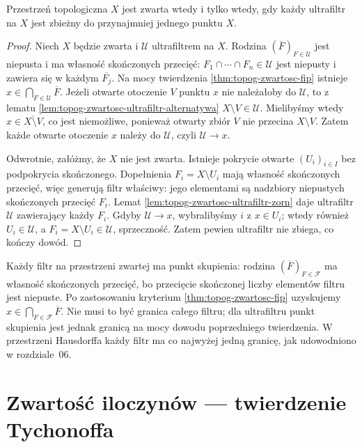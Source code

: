 \begin{twierdzenie}
\label{thm:topog-zwartosc-ultrafiltry}
Przestrzeń topologiczna $X$ jest zwarta wtedy i tylko
wtedy, gdy każdy ultrafiltr na $X$ jest zbieżny
do przynajmniej jednego punktu $X$.
\end{twierdzenie}
\begin{proof}
Niech $X$ będzie zwarta i $\mathcal U$
ultrafiltrem na $X$. Rodzina
$(\overline F)_{F\in\mathcal U}$ jest niepusta
i ma własność skończonych przecięć:
$F_1\cap\cdots\cap F_n\in\mathcal U$ jest
niepusty i zawiera się w każdym $\overline{F_j}$.
Na mocy twierdzenia \ref{thm:topog-zwartosc-fip}
istnieje $x\in\bigcap_{F\in\mathcal U}\overline F$.
Jeżeli otwarte otoczenie $V$ punktu $x$ nie należałoby
do $\mathcal U$, to z lematu
\ref{lem:topog-zwartosc-ultrafiltr-alternatywa}
$X\setminus V\in\mathcal U$.
Mielibyśmy wtedy $x\in\overline{X\setminus V}$,
co jest niemożliwe, ponieważ otwarty zbiór $V$
nie przecina $X\setminus V$.
Zatem każde otwarte otoczenie $x$ należy do
$\mathcal U$, czyli $\mathcal U\to x$.

Odwrotnie, załóżmy, że $X$ nie jest zwarta.
Istnieje pokrycie otwarte $(U_i)_{i\in I}$
bez podpokrycia skończonego. Dopełnienia
$F_i=X\setminus U_i$ mają własność skończonych
przecięć, więc generują filtr właściwy:
jego elementami są nadzbiory niepustych skończonych
przecięć $F_i$. Lemat
\ref{lem:topog-zwartosc-ultrafiltr-zorn}
daje ultrafiltr $\mathcal U$ zawierający każdy $F_i$.
Gdyby $\mathcal U\to x$, wybralibyśmy $i$ z
$x\in U_i$; wtedy również $U_i\in\mathcal U$,
a $F_i=X\setminus U_i\in\mathcal U$, sprzeczność.
Zatem pewien ultrafiltr nie zbiega, co kończy dowód.
\end{proof}

\begin{uwaga}
\label{rem:topog-zwartosc-filtr-zbieznosc}
Każdy filtr na przestrzeni zwartej ma punkt skupienia:
rodzina $(\overline F)_{F\in\mathcal F}$ ma własność
skończonych przecięć, bo przecięcie skończonej liczby
elementów filtru jest niepuste. Po zastosowaniu
kryterium \ref{thm:topog-zwartosc-fip} uzyskujemy
$x\in\bigcap_{F\in\mathcal F}\overline F$.
Nie musi to być granica całego filtru; dla ultrafiltru
punkt skupienia jest jednak granicą na mocy dowodu
poprzedniego twierdzenia. W przestrzeni Hausdorffa
każdy filtr ma co najwyżej jedną granicę, jak
udowodniono w rozdziale~06.
\end{uwaga}

\section{Zwartość iloczynów — twierdzenie Tychonoffa}
\label{sec:topog-zwartosc-iloczyny}

